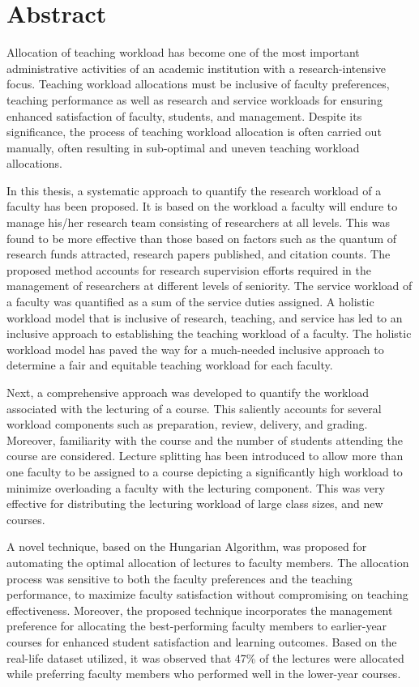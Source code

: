 \chapter*{Abstract}

Allocation of teaching workload has become one of the most important administrative activities of an academic institution with a research-intensive focus. Teaching workload allocations must be inclusive of faculty preferences, teaching performance as well as research and service workloads for ensuring enhanced satisfaction of faculty, students, and management. Despite its significance, the process of teaching workload allocation is often carried out manually, often resulting in sub-optimal and uneven teaching workload allocations.

In this thesis, a systematic approach to quantify the research workload of a faculty has been proposed. It is based on the workload a faculty will endure to manage his/her research team consisting of researchers at all levels. This was found to be more effective than those based on factors such as the quantum of research funds attracted, research papers published, and citation counts. The proposed method accounts for research supervision efforts required in the management of researchers at different levels of seniority. The service workload of a faculty was quantified as a sum of the service duties assigned. A holistic workload model that is inclusive of research, teaching, and service has led to an inclusive approach to establishing the teaching workload of a faculty. The holistic workload model has paved the way for a much-needed inclusive approach to determine a fair and equitable teaching workload for each faculty.

Next, a comprehensive approach was developed to quantify the workload associated with the lecturing of a course. This saliently accounts for several workload components such as preparation, review, delivery, and grading. Moreover, familiarity with the course and the number of students attending the course are considered. Lecture splitting has been introduced to allow more than one faculty to be assigned to a course depicting a significantly high workload to minimize overloading a faculty with the lecturing component. This was very effective for distributing the lecturing workload of large class sizes, and new courses.

A novel technique, based on the Hungarian Algorithm, was proposed for automating the optimal allocation of lectures to faculty members. The allocation process was sensitive to both the faculty preferences and the teaching performance, to maximize faculty satisfaction without compromising on teaching effectiveness. Moreover, the proposed technique incorporates the management preference for allocating the best-performing faculty members to earlier-year courses for enhanced student satisfaction and learning outcomes. Based on the real-life dataset utilized, it was observed that 47\% of the lectures were allocated while preferring faculty members who performed well in the lower-year courses.

